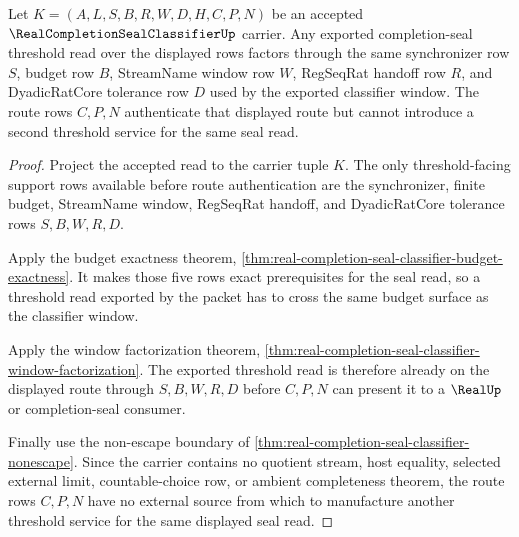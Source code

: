 \begin{theorem}
\label{thm:real-completion-seal-classifier-threshold-uniqueness}
Let $K=(A,L,S,B,R,W,D,H,C,P,N)$ be an accepted $\RealCompletionSealClassifierUp$ carrier. Any exported completion-seal threshold read over the displayed rows factors through the same synchronizer row $S$, budget row $B$, StreamName window row $W$, RegSeqRat handoff row $R$, and DyadicRatCore tolerance row $D$ used by the exported classifier window. The route rows $C,P,N$ authenticate that displayed route but cannot introduce a second threshold service for the same seal read.
\end{theorem}
\begin{proof}
Project the accepted read to the carrier tuple $K$. The only threshold-facing support rows available before route authentication are the synchronizer, finite budget, StreamName window, RegSeqRat handoff, and DyadicRatCore tolerance rows $S,B,W,R,D$.

Apply the budget exactness theorem, \autoref{thm:real-completion-seal-classifier-budget-exactness}. It makes those five rows exact prerequisites for the seal read, so a threshold read exported by the packet has to cross the same budget surface as the classifier window.

Apply the window factorization theorem, \autoref{thm:real-completion-seal-classifier-window-factorization}. The exported threshold read is therefore already on the displayed route through $S,B,W,R,D$ before $C,P,N$ can present it to a $\RealUp$ or completion-seal consumer.

Finally use the non-escape boundary of \autoref{thm:real-completion-seal-classifier-nonescape}. Since the carrier contains no quotient stream, host equality, selected external limit, countable-choice row, or ambient completeness theorem, the route rows $C,P,N$ have no external source from which to manufacture another threshold service for the same displayed seal read.
\end{proof}

